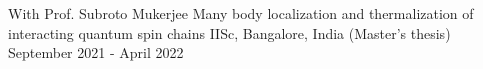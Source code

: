 

\begin{cventries}


\cventry
{With Prof. Subroto Mukerjee} %
{Many body localization and thermalization of interacting quantum spin chains} %
{IISc, Bangalore, India \space \space\space\space\space\space\space\space\space\space\space(Master's thesis)} %
{September 2021 - April 2022} %
{
	\begin{cvitems} %
	\end{cvitems}
}

\end{cventries}
